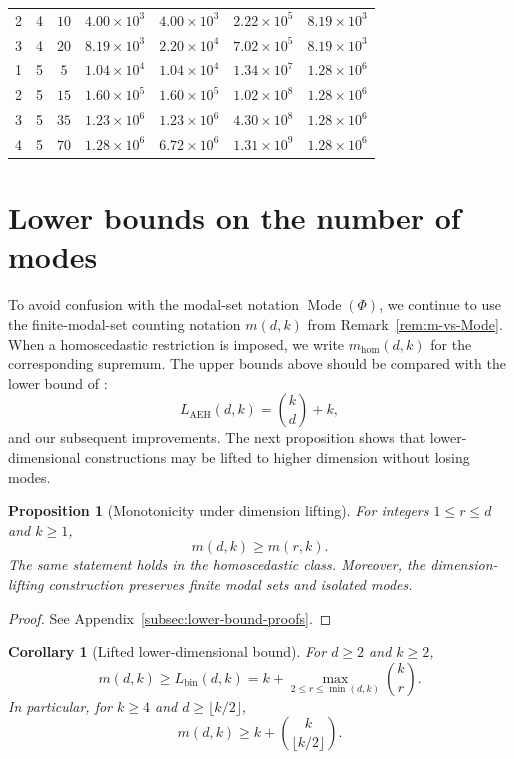 \documentclass[11pt]{article}
\theoremstyle{plain}
\newtheorem{proposition}[theorem]{Proposition}
\newtheorem{corollary}[theorem]{Corollary}
\theoremstyle{definition}
\theoremstyle{remark}
\numberwithin{equation}{section}
\DeclareMathOperator{\Mode}{Mode}
\begin{document}
\begin{table}[htbp]
\begin{tabular}{ccccccc}
2 & 4 & $10$ & $4.00\times 10^{3}$ & $4.00\times 10^{3}$ & $2.22\times 10^{5}$ & $8.19\times 10^{3}$ \\
3 & 4 & $20$ & $8.19\times 10^{3}$ & $2.20\times 10^{4}$ & $7.02\times 10^{5}$ & $8.19\times 10^{3}$ \\
1 & 5 & $5$ & $1.04\times 10^{4}$ & $1.04\times 10^{4}$ & $1.34\times 10^{7}$ & $1.28\times 10^{6}$ \\
2 & 5 & $15$ & $1.60\times 10^{5}$ & $1.60\times 10^{5}$ & $1.02\times 10^{8}$ & $1.28\times 10^{6}$ \\
3 & 5 & $35$ & $1.23\times 10^{6}$ & $1.23\times 10^{6}$ & $4.30\times 10^{8}$ & $1.28\times 10^{6}$ \\
4 & 5 & $70$ & $1.28\times 10^{6}$ & $6.72\times 10^{6}$ & $1.31\times 10^{9}$ & $1.28\times 10^{6}$ \\
\bottomrule
\end{tabular}
\end{table}

\section{Lower bounds on the number of modes}\label{sec:lower-mode-bounds}
To avoid confusion with the modal-set notation $\Mode(\Phi)$, we continue to use the finite-modal-set counting notation $m(d,k)$ from Remark~\ref{rem:m-vs-Mode}. When a homoscedastic restriction is imposed, we write $m_{\mathrm{hom}}(d,k)$ for the corresponding supremum. The upper bounds above should be compared with the lower bound of \citet[Theorem~4.1]{AmendolaEngstromHaase2019}:
\[
L_{\mathrm{AEH}}(d,k)=\binom{k}{d}+k,
\]
and our subsequent improvements. The next proposition shows that lower-dimensional constructions may be lifted to higher dimension without losing modes.

\begin{proposition}[Monotonicity under dimension lifting]\label{prop:ambient-monotonicity}
For integers $1\le r\le d$ and $k\ge 1$,
\[
m(d,k)\ge m(r,k).
\]
The same statement holds in the homoscedastic class. Moreover, the dimension-lifting construction preserves finite modal sets and isolated modes.
\end{proposition}

\begin{proof}
See Appendix~\ref{subsec:lower-bound-proofs}.
\end{proof}

\begin{corollary}[Lifted lower-dimensional bound]\label{cor:lifted-lower}
For $d\ge 2$ and $k\ge 2$,
\[
m(d,k)\ge L_{\mathrm{bin}}(d,k)=k+\max_{2\le r\le \min(d,k)}\binom{k}{r}.
\]
In particular, for $k\ge 4$ and $d\ge \lfloor k/2\rfloor$,
\[
m(d,k)\ge k+\binom{k}{\lfloor k/2\rfloor}.
\]
\end{corollary}
\end{document}
